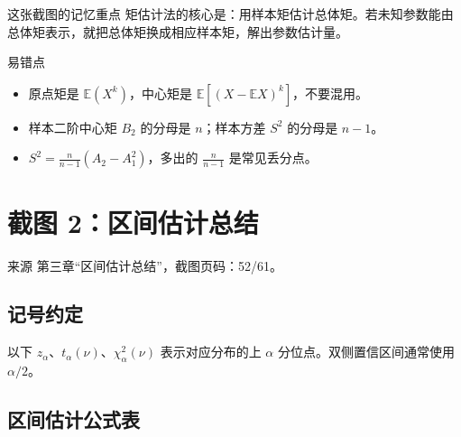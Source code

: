 \documentclass[UTF8,zihao=-4,fontset=fandol]{ctexart}
\newcommand{\E}{\mathbb{E}}
\begin{document}
\begin{methodbox}{这张截图的记忆重点}
矩估计法的核心是：用样本矩估计总体矩。若未知参数能由总体矩表示，就把总体矩换成相应样本矩，解出参数估计量。
\end{methodbox}

\begin{warnbox}{易错点}
\begin{itemize}
  \item 原点矩是 $\E(X^k)$，中心矩是 $\E[(X-\E X)^k]$，不要混用。
  \item 样本二阶中心矩 $B_2$ 的分母是 $n$；样本方差 $S^2$ 的分母是 $n-1$。
  \item $S^2=\frac{n}{n-1}(A_2-A_1^2)$，多出的 $\frac{n}{n-1}$ 是常见丢分点。
\end{itemize}
\end{warnbox}

\section{截图 2：区间估计总结}

\begin{sourcebox}{来源}
第三章“区间估计总结”，截图页码：52/61。
\end{sourcebox}

\subsection{记号约定}

以下 $z_{\alpha}$、$t_{\alpha}(\nu)$、$\chi^2_{\alpha}(\nu)$ 表示对应分布的上 $\alpha$ 分位点。双侧置信区间通常使用 $\alpha/2$。

\subsection{区间估计公式表}
\end{document}
